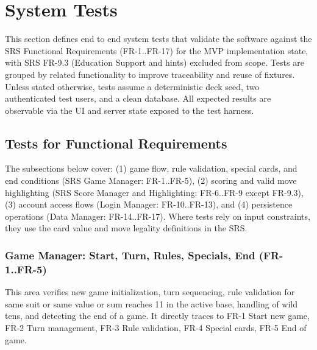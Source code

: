 \documentclass[12pt, titlepage]{article}
\begin{document}
\section{System Tests}

This section defines end to end system tests that validate the software against the SRS Functional Requirements (FR-1..FR-17) for the MVP implementation state, with SRS FR-9.3 (Education Support and hints) excluded from scope. Tests are grouped by related functionality to improve traceability and reuse of fixtures. Unless stated otherwise, tests assume a deterministic deck seed, two authenticated test users, and a clean database. All expected results are observable via the UI and server state exposed to the test harness.

\subsection{Tests for Functional Requirements}

The subsections below cover: (1) game flow, rule validation, special cards, and end conditions (SRS Game Manager: FR-1..FR-5), (2) scoring and valid move highlighting (SRS Score Manager and Highlighting: FR-6..FR-9 except FR-9.3), (3) account access flows (Login Manager: FR-10..FR-13), and (4) persistence operations (Data Manager: FR-14..FR-17). Where tests rely on input constraints, they use the card value and move legality definitions in the SRS.

\subsubsection{Game Manager: Start, Turn, Rules, Specials, End (FR-1..FR-5)}

This area verifies new game initialization, turn sequencing, rule validation for same suit or same value or sum reaches 11 in the active base, handling of wild tens, and detecting the end of a game. It directly traces to FR-1 Start new game, FR-2 Turn management, FR-3 Rule validation, FR-4 Special cards, FR-5 End of game.
\end{document}

